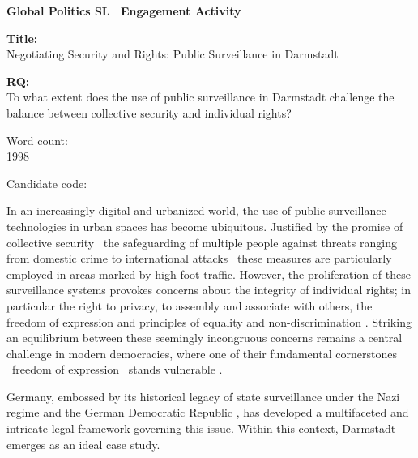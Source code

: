 \documentclass[12pt]{article}
\begin{document}
	
	\begin{titlepage}
		\centering
		
		\textbf{Global Politics SL \textemdash\ Engagement Activity}
		
		\vspace*{4cm}
		
		\textbf{Title:}\\
		Negotiating Security and Rights: Public Surveillance in Darmstadt
		
		\vspace{1cm}
		
		\textbf{RQ:}\\
		To what extent does the use of public surveillance in Darmstadt challenge the balance between collective security and individual rights?
		
		\vspace{3cm}
		
		Word count:\\
		1998
		
		\vspace{4cm}
		Candidate code: \textbf{}
		
		\vfill
	\end{titlepage}
	
	
	In an increasingly digital and urbanized world, the use of public surveillance technologies in urban spaces has become ubiquitous. Justified by the promise of collective security \textemdash\ the safeguarding of multiple people against threats ranging from domestic crime to international attacks \parencites{noauthor_security_2025}{noauthor_collective_2025} \textemdash\ these measures are particularly employed in areas marked by high foot traffic. However, the proliferation of these surveillance systems provokes concerns about the integrity of individual rights; in particular the right to privacy, to assembly and associate with others, the freedom of expression and principles of equality and non-discrimination \parencite{nandy2023}. Striking an equilibrium between these seemingly incongruous concerns remains a central challenge in modern democracies, where one of their fundamental cornerstones \textemdash\ freedom of expression \textemdash\ stands vulnerable \parencite{noauthor_special_nodate}. 
		
	Germany, embossed by its historical legacy of state surveillance under the Nazi regime \parencite{mdrde_uberwachung_nodate} and the German Democratic Republic \parencite{lichter_loeffler_siegloch2016}, has developed a multifaceted and intricate legal framework governing this issue. Within this context, Darmstadt emerges as an ideal case study.
	
\end{document}
